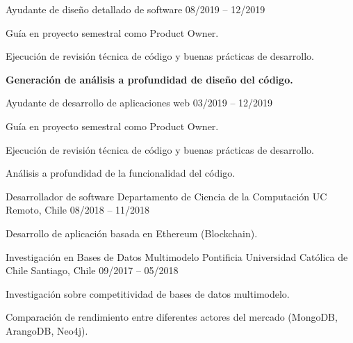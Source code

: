 \begin{cventries}
  \cventry
    {Ayudante de diseño detallado de software} %
    { } %
    { } %
    {08/2019 – 12/2019} %
    {
      \begin{cvitems} %
        \item {Guía en proyecto semestral como Product Owner.}
        \item {Ejecución de revisión técnica de código y buenas prácticas de desarrollo.}
        \item {\textbf{Generación de análisis a profundidad de diseño del código.}}
      \end{cvitems}
    }

  \cventry
    {Ayudante de desarrollo de aplicaciones web} %
    { } %
    { } %
    {03/2019 – 12/2019} %
    {
      \begin{cvitems} %
        \item {Guía en proyecto semestral como Product Owner.}
        \item {Ejecución de revisión técnica de código y buenas prácticas de desarrollo.}
        \item {Análisis a profundidad de la funcionalidad del código.}
      \end{cvitems}
    }

  \cventry
    {Desarrollador de software} %
    {Departamento de Ciencia de la Computación UC} %
    {Remoto, Chile} %
    {08/2018 – 11/2018} %
    {
      \begin{cvitems} %
        \item {Desarrollo de aplicación basada en Ethereum (Blockchain).}
      \end{cvitems}
    }

  \cventry
    {Investigación en Bases de Datos Multimodelo} %
    {Pontificia Universidad Católica de Chile} %
    {Santiago, Chile} %
    {09/2017 – 05/2018} %
    {
      \begin{cvitems} %
        \item {Investigación sobre competitividad de bases de datos multimodelo.}
        \item {Comparación de rendimiento entre diferentes actores del mercado (MongoDB, ArangoDB, Neo4j).}
      \end{cvitems} 
    }


\end{cventries}
